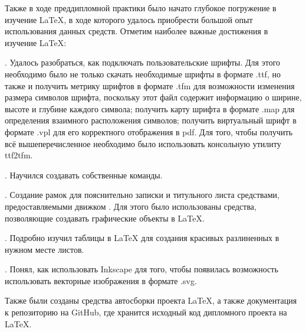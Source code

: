 {    \par \redline Также в ходе преддипломной практики было начато глубокое погружение в изучение \LaTeX, в ходе которого удалось приобрести большой опыт использования данных средств. Отметим наиболее важные достижения в изучение \LaTeX:

    \par {}. Удалось разобраться, как подключать пользовательские шрифты. Для этого необходимо было не только скачать необходимые шрифты в формате .ttf, но также и получить метрику шрифтов в формате .tfm для возможности изменения размера символов шрифта, поскольку этот файл содержит информацию о ширине, высоте и глубине каждого символа; получить карту шрифта в формате .map для определения взаимного расположения символов; получить виртуальный шрифт в формате .vpl для его корректного отображения в pdf. Для того, чтобы получить всё вышеперечисленное необходимо было использовать консольную утилиту ttf2tfm.

    \par {}. Научился создавать собственные команды.

    \par {}. Создание рамок для пояснительно записки и титульного листа средствами, предоставляемыми движком \XeLaTeX. Для этого было использованы средства, позволяющие создавать графические объекты в \LaTeX.

    \par {}. Подробно изучил таблицы в \LaTeX \hspace{2pt} для создания красивых разлиненных в нужном месте листов.  

    \par {}. Понял, как использовать Inkscape для того, чтобы появилась возможность использовать векторные изображения в формате .svg. 

    \par \redline Также были созданы средства автосборки проекта \LaTeX, а также документация к репозиторию на GitHub, где хранится исходный код дипломного проекта на \LaTeX.

    \par
}
